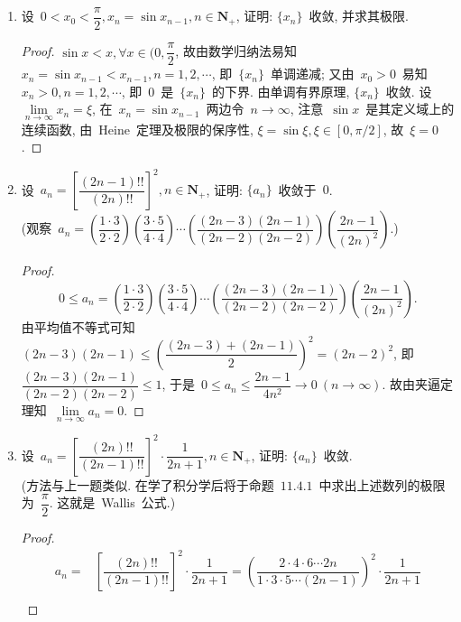 \documentclass[UTF8,a4paper,10pt,twoside]{book}
\begin{document}
\begin{enumerate}
\begin{proof}
\begin{equation*}
\begin{split}
				      =                & \dfrac{1-2^{k(1-p)}}{1-2^{1-p}}\leqslant \dfrac{1}{1-2^{1-p}}
			      \end{split}
		      \end{equation*}
		      这表明~$\{S_n\}$~有界, 又显然~$\{S_n\}$~单调递增, 故由单调有界原理知~$\{S_n\}$~收敛.\qedhere
	      \end{proof}
	\item 设~$0<x_0<\dfrac{\pi}{2}, x_n=\sin{x_{n-1}}, n\in\mathbf{N}_{+}$, 证明: $\{x_n\}$~收敛, 并求其极限.
	      \begin{proof}
		      $\sin{x}<x, \forall x\in(0,\dfrac{\pi}{2}$, 故由数学归纳法易知~$x_n=\sin{x_{n-1}}<x_{n-1}, n=1, 2,\cdots$, 即~$\{x_n\}$~单调递减; 又由~$x_0>0$~易知~$x_n>0, n=1,2,\cdots$, 即~$0$~是~$\{x_n\}$~的下界. 由单调有界原理, $\{x_n\}$~收敛. 设~$\lim\limits_{n\to\infty} x_n=\xi$, 在~$x_n=\sin{x_{n-1}}$~两边令~$n\to\infty$, 注意~$\sin{x}$~是其定义域上的连续函数, 由~Heine~定理及极限的保序性, $\xi=\sin{\xi}, \xi\in[0,\pi/2]$, 故~$\xi=0$.\qedhere
	      \end{proof}
	\item 设~$a_n=\left[\dfrac{(2n-1)!!}{(2n)!!}\right]^2, n\in\mathbf{N}_{+}$, 证明: $\{a_n\}$~收敛于~$0$.\\
	      (观察~$a_n=\left(\dfrac{1\cdot3}{2\cdot2}\right)\left(\dfrac{3\cdot5}{4\cdot4}\right)\cdots\left(\dfrac{(2n-3)(2n-1)}{(2n-2)(2n-2)}\right)\left(\dfrac{2n-1}{(2n)^2}\right)$.)
	      \begin{proof}
		      \[
			      0\leqslant a_n=\left(\dfrac{1\cdot3}{2\cdot2}\right)\left(\dfrac{3\cdot5}{4\cdot4}\right)\cdots\left(\dfrac{(2n-3)(2n-1)}{(2n-2)(2n-2)}\right)\left(\dfrac{2n-1}{(2n)^2}\right).
		      \]
		      由平均值不等式可知~$(2n-3)(2n-1)\leqslant\left(\dfrac{(2n-3)+(2n-1)}{2}\right)^2=(2n-2)^2$, 即~$\dfrac{(2n-3)(2n-1)}{(2n-2)(2n-2)}\leqslant 1$, 于是~$0\leqslant a_n\leqslant\dfrac{2n-1}{4n^2}\to 0\ (n\to\infty)$. 故由夹逼定理知~$\lim\limits_{n\to\infty} a_n=0$.\qedhere
	      \end{proof}
	\item 设~$a_n=\left[\dfrac{(2n)!!}{(2n-1)!!}\right]^2\cdot\dfrac{1}{2n+1}, n\in\mathbf{N}_{+}$, 证明: $\{a_n\}$~收敛.\\
	      (方法与上一题类似. 在学了积分学后将于命题~$11.4.1$~中求出上述数列的极限为~$\dfrac{\pi}{2}$. 这就是~Wallis~公式.)
	      \begin{proof}
		      \begin{equation*}
			      \begin{split}
				      a_n=&\left[\dfrac{(2n)!!}{(2n-1)!!}\right]^2\cdot\dfrac{1}{2n+1}=\left(\dfrac{2\cdot4\cdot6\cdots2n}{1\cdot3\cdot5\cdots(2n-1)}\right)^2\cdot\dfrac{1}{2n+1}\\

\end{split}
\end{equation*}
\end{proof}
\end{enumerate}
\end{document}
